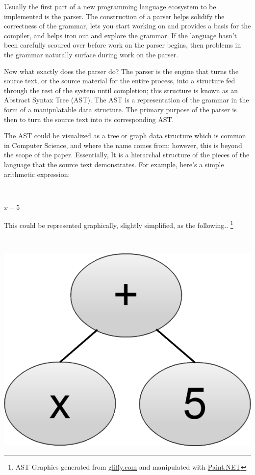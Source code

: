\documentclass[titlepage]{article}
\begin{document}
			Usually the first part of a new programming language ecosystem to be implemented is the parser.  The construction of a parser helps solidify the correctness of the grammar, lets you start working on and provides a basis for the compiler, and helps iron out and explore the grammar.  If the language hasn't been carefully scoured over before work on the parser begins, then problems in the grammar naturally surface during work on the parser.

			Now what exactly does the parser do?  The parser is the engine that turns the source text, or the source material for the entire process, into a structure fed through the rest of the system until completion; this structure is known as an Abstract Syntax Tree (AST).  The AST is a representation of the grammar in the form of a manipulatable data structure.  The primary purpose of the parser is then to turn the source text into its corresponding AST.

			The AST could be visualized as a tree or graph data structure which is common in Computer Science, and where the name comes from; however, this is beyond the scope of the paper.  Essentially, It is a hierarchal structure of the pieces of the language that the source text demonstrates.  For example, here's a simple arithmetic expression:
			\newline

			~\centerline{\Large{$x + 5$}}
			\newline

			This could be represented graphically, slightly simplified, as the following..
			\footnote{AST Graphics generated from \href{http://www.gliffy.com}{gliffy.com} and manipulated with \href{http://www.getpaint.net/}{Paint.NET}}
			\newline

			~\centerline{\includegraphics[scale=.3]{ExampleSimpleAST.png}}
			\newline
\end{document}
